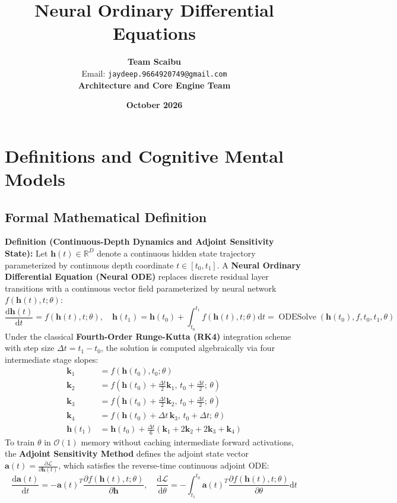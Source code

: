 \documentclass[11pt,a4paper]{article}
\title{\textbf{Neural Ordinary Differential Equations}}
\author{\textbf{Team Scaibu} \\ \small Email: \texttt{jaydeep.9664920749@gmail.com} \\ \small \textbf{Architecture and Core Engine Team}}
\date{\textbf{October 2026}}
\theoremstyle{definition}
\begin{document}
\maketitle

\section{Definitions and Cognitive Mental Models}

\subsection{Formal Mathematical Definition}
\textbf{Definition (Continuous-Depth Dynamics and Adjoint Sensitivity State):}
Let $\mathbf{h}(t) \in \mathbb{R}^D$ denote a continuous hidden state trajectory parameterized by continuous depth coordinate $t \in [t_0, t_1]$. A \textbf{Neural Ordinary Differential Equation (Neural ODE)} replaces discrete residual layer transitions with a continuous vector field parameterized by neural network $f(\mathbf{h}(t), t; \theta)$:
{\boldmath
\begin{equation}
\frac{\mathrm{d}\mathbf{h}(t)}{\mathrm{d}t} = f(\mathbf{h}(t), t; \theta), \quad \mathbf{h}(t_1) = \mathbf{h}(t_0) + \int_{t_0}^{t_1} f(\mathbf{h}(t), t; \theta) \mathrm{d}t = \operatorname{ODESolve}(\mathbf{h}(t_0), f, t_0, t_1, \theta)
\end{equation}
}
Under the classical \textbf{Fourth-Order Runge-Kutta (RK4)} integration scheme with step size $\Delta t = t_1 - t_0$, the solution is computed algebraically via four intermediate stage slopes:
{\boldmath
\begin{align}
\mathbf{k}_1 &= f(\mathbf{h}(t_0), t_0; \theta) \\
\mathbf{k}_2 &= f\left( \mathbf{h}(t_0) + \frac{\Delta t}{2}\mathbf{k}_1, \, t_0 + \frac{\Delta t}{2}; \, \theta \right) \\
\mathbf{k}_3 &= f\left( \mathbf{h}(t_0) + \frac{\Delta t}{2}\mathbf{k}_2, \, t_0 + \frac{\Delta t}{2}; \, \theta \right) \\
\mathbf{k}_4 &= f\left( \mathbf{h}(t_0) + \Delta t \, \mathbf{k}_3, \, t_0 + \Delta t; \, \theta \right) \\
\mathbf{h}(t_1) &= \mathbf{h}(t_0) + \frac{\Delta t}{6} \left( \mathbf{k}_1 + 2\mathbf{k}_2 + 2\mathbf{k}_3 + \mathbf{k}_4 \right)
\end{align}
}
To train $\theta$ in $\mathcal{O}(1)$ memory without caching intermediate forward activations, the \textbf{Adjoint Sensitivity Method} defines the adjoint state vector $\mathbf{a}(t) = \frac{\partial \mathcal{L}}{\partial \mathbf{h}(t)}$, which satisfies the reverse-time continuous adjoint ODE:
{\boldmath
\begin{equation}
\frac{\mathrm{d}\mathbf{a}(t)}{\mathrm{d}t} = -\mathbf{a}(t)^T \frac{\partial f(\mathbf{h}(t), t; \theta)}{\partial \mathbf{h}}, \quad \frac{\mathrm{d}\mathcal{L}}{\mathrm{d}\theta} = -\int_{t_1}^{t_0} \mathbf{a}(t)^T \frac{\partial f(\mathbf{h}(t), t; \theta)}{\partial \theta} \mathrm{d}t
\end{equation}
}
\end{document}
